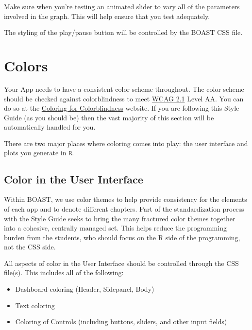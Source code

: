 \documentclass[
]{book}
\providecommand{\tightlist}{%
  \setlength{\itemsep}{0pt}\setlength{\parskip}{0pt}}
\begin{document}
Make sure when you're testing an animated slider to vary all of the parameters involved in the graph. This will help ensure that you test adequately.

The styling of the play/pause button will be controlled by the BOAST CSS file.

\hypertarget{colors}{%
\section{Colors}\label{colors}}

Your App needs to have a consistent color scheme throughout. The color scheme should be checked against colorblindness to meet \href{https://www.w3.org/WAI/WCAG21/quickref/}{WCAG 2.1} Level AA. You can do so at the \href{https://davidmathlogic.com/colorblind/\#\%23000000-\%23E69F00-\%2356B4E9-\%23009E73-\%23F0E442-\%230072B2-\%23D55E00-\%23CC79A7}{Coloring for Colorblindness} website. If you are following this Style Guide (as you should be) then the vast majority of this section will be automatically handled for you.

There are two major places where coloring comes into play: the user interface and plots you generate in \texttt{R}.

\hypertarget{colorUI}{%
\subsection{Color in the User Interface}\label{colorUI}}

Within BOAST, we use color themes to help provide consistency for the elements of each app and to denote different chapters. Part of the standardization process with the Style Guide seeks to bring the many fractured color themes together into a cohesive, centrally managed set. This helps reduce the programming burden from the students, who should focus on the R side of the programming, not the CSS side.

All aspects of color in the User Interface should be controlled through the CSS file(s). This includes all of the following:

\begin{itemize}
\tightlist
\item
  Dashboard coloring (Header, Sidepanel, Body)
\item
  Text coloring
\item
  Coloring of Controls (including buttons, sliders, and other input fields)
\end{itemize}
\end{document}
